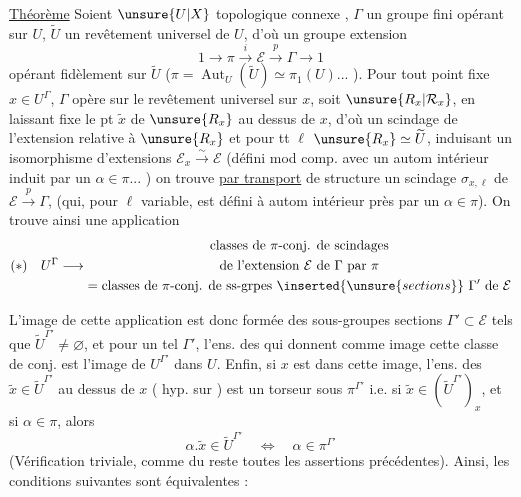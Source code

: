 \uline{Théorème} Soient $\unsure{U|X}$   topologique connexe , $\Gamma$ un groupe fini opérant  sur $U$, $\widetilde U$ un revêtement universel de $U$, d'où  un groupe extension
\[
1\longrightarrow\pi\xrightarrow{i}\mathcal E\xrightarrow{p}\Gamma\longrightarrow1
\]
opérant fidèlement sur $\widetilde U$ ($\pi=\operatorname{Aut}_U(\widetilde U)\simeq\pi_1(U)$... ).
Pour tout point fixe $x\in U^\Gamma$, $\Gamma$ opère sur le revêtement universel  sur $x$, soit  $\unsure{R_x|\mathcal R_x}$, en laissant fixe le pt  $\widetilde x$ de $\unsure{R_x}$ au dessus de $x$, d'où un scindage de l'extension relative à $\unsure{R_x}$
et pour tt   $\ell$  $\unsure{R_x}\simeq\widetilde U$, induisant un isomorphisme d'extensions $\mathcal E_x\xrightarrow{\sim}\mathcal E$ (défini  mod comp. avec un autom intérieur induit par un $\alpha\in\pi$... ) on trouve \uline{par transport} de structure un scindage $\sigma_{x,\ell}$ de $\mathcal E\xrightarrow{p}\Gamma$, (qui, pour $\ell$ variable, est défini à autom intérieur près par un $\alpha\in\pi$).
On trouve ainsi une application
\[
(*)\quad U^\Gamma\longrightarrow
\begin{gathered}
\text{classes de }\pi\text{-conj. de scindages}\\
\text{de l'extension }\mathcal E\text{ de }\Gamma\text{ par }\pi\\
=\text{classes de }\pi\text{-conj. de ss-grpes }\inserted{\unsure{sections}}\ \Gamma'\text{ de }\mathcal E
\end{gathered}
\]

L'image de cette application est donc formée des  sous-groupes sections $\Gamma'\subset\mathcal E$ tels que $\widetilde U^{\Gamma'}\ne\varnothing$, et pour un tel $\Gamma'$, l'ens. des  qui  donnent comme image cette classe de conj. est l'image de $U^{\Gamma'}$ dans $U$. Enfin, si $x$ est dans cette image, l'ens.  des $\widetilde x\in\widetilde U^{\Gamma'}$ au dessus de $x$ (\deleted{\unsure{$\ne\varnothing$}} hyp. sur ) est un torseur sous $\pi^{\Gamma'}$ i.e. si $\widetilde x\in(\widetilde U^{\Gamma'})_x$,  et si $\alpha\in\pi$, alors
\[
\alpha.\widetilde x\in\widetilde U^{\Gamma'}\quad\Longleftrightarrow\quad\alpha\in\pi^{\Gamma'}
\]
(Vérification triviale, comme du reste toutes les assertions précédentes). Ainsi, les conditions suivantes sont équivalentes :

